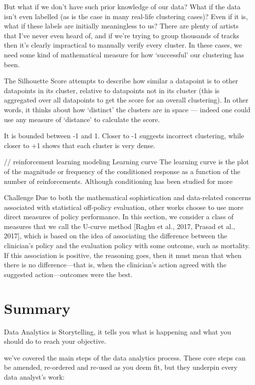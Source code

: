 But what if we don’t have such prior knowledge of our data? What if the data isn’t even labelled (as is the case in many real-life clustering cases)? Even if it is, what if these labels are initially meaningless to us? There are plenty of artists that I’ve never even heard of, and if we’re trying to group thousands of tracks then it’s clearly impractical to manually verify every cluster. In these cases, we need some kind of mathematical measure for how ‘successful’ our clustering has been.

The Silhouette Score attempts to describe how similar a datapoint is to other datapoints in its cluster, relative to datapoints not in its cluster (this is aggregated over all datapoints to get the score for an overall clustering). In other words, it thinks about how ‘distinct’ the clusters are in space — indeed one could use any measure of ‘distance’ to calculate the score.

It is bounded between -1 and 1. Closer to -1 suggests incorrect clustering, while closer to +1 shows that each cluster is very dense.

// reinforcement learning modeling
Learning curve 
The learning curve is the plot of the magnitude or frequency of the conditioned response as a function of the number of reinforcements. Although conditioning has been studied for more

Challenge Due to both the mathematical sophistication and data-related concerns associated with statistical off-policy evaluation, other works choose to use more direct measures of policy performance. In this section, we consider a class of measures that we call the U-curve
method [Raghu et al., 2017, Prasad et al., 2017], which is based on the idea of associating
the difference between the clinician’s policy and the evaluation policy with some outcome,
such as mortality. If this association is positive, the reasoning goes, then it must mean that
when there is no difference—that is, when the clinician’s action agreed with the suggested
action—outcomes were the best.


\section{Summary}
Data Analytics is Storytelling, it tells you what is happening and what you should do to reach your objective.

we’ve covered the main steps of the data analytics process. These core steps can be amended, re-ordered and re-used as you deem fit, but they underpin every data analyst’s work:

